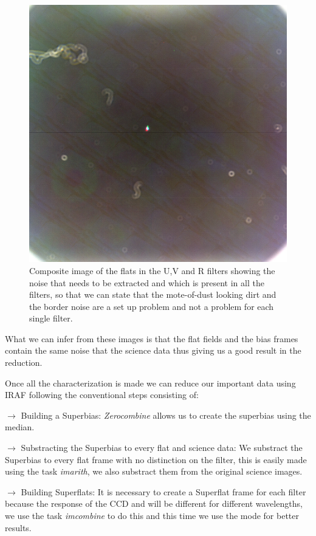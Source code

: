 \begin{figure}[H]
\begin{minipage}[b]{0.47\textwidth}
    \includegraphics[width=\textwidth]{images/ruido.png}
    \caption[Clean image of NGC5139]{Composite image of the flats in the U,V and R filters showing the noise that needs to be extracted and which is present in all the filters, so that we can state that the mote-of-dust looking dirt and the border noise are a set up problem and not a problem for each single filter.}
  \end{minipage}
\end{figure}

What we can infer from these images is that the flat fields and the bias frames contain the same noise that the science data thus giving us a good result in the reduction.

Once all the characterization is made we can reduce our important data using IRAF following the conventional steps consisting of: 

$\rightarrow$ Building a Superbias: \textit{Zerocombine} allows us to create the superbias using the median.

$\rightarrow$ Substracting the Superbias to every flat and science data: We substract the Superbias to every flat frame with no distinction on the filter, this is easily made using the task \textit{imarith}, we also substract them from the original science images.

$\rightarrow$ Building Superflats: It is necessary to create a Superflat frame for each filter because the response of the CCD and will be different for different wavelengths, we use the task \textit{imcombine} to do this and this time we use the mode for better results.   

